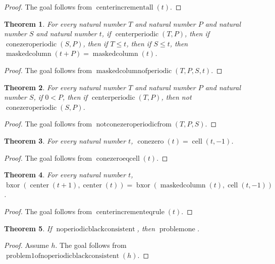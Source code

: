 \documentclass[11pt]{article}
\newtheorem{theorem}{Theorem}[section]
\theoremstyle{definition}
\begin{document}
\begin{proof}
The goal follows from \(\operatorname{centerincrementall}(t)\).
\end{proof}
\begin{theorem}
\label{ll:observations:masked-column-of-periodic}
For every natural number \(T\) and natural number \(P\) and natural number \(S\) and natural number \(t\), if \(\operatorname{centerperiodic}(T, P)\), then if \(\operatorname{conezeroperiodic}(S, P)\), then if \(T \le t\), then if \(S \le t\), then \(\operatorname{maskedcolumn}(t + P) = \operatorname{maskedcolumn}(t)\).
\end{theorem}
\begin{proof}
The goal follows from \(\operatorname{maskedcolumnofperiodic}(T, P, S, t)\).
\end{proof}
\begin{theorem}
\label{ll:observations:not-cone-zero-periodic-from}
For every natural number \(T\) and natural number \(P\) and natural number \(S\), if \(0 < P\), then if \(\operatorname{centerperiodic}(T, P)\), then not \(\operatorname{conezeroperiodic}(S, P)\).
\end{theorem}
\begin{proof}
The goal follows from \(\operatorname{notconezeroperiodicfrom}(T, P, S)\).
\end{proof}
\begin{theorem}
\label{ll:observations:cone-zero-eq-cell}
For every natural number \(t\), \(\operatorname{conezero}(t) = \operatorname{cell}(t, -1)\).
\end{theorem}
\begin{proof}
The goal follows from \(\operatorname{conezeroeqcell}(t)\).
\end{proof}
\begin{theorem}
\label{ll:observations:center-increment-eq-rule}
For every natural number \(t\), \(\operatorname{bxor}(\operatorname{center}(t + 1), \operatorname{center}(t)) = \operatorname{bxor}(\operatorname{maskedcolumn}(t), \operatorname{cell}(t, -1))\).
\end{theorem}
\begin{proof}
The goal follows from \(\operatorname{centerincrementeqrule}(t)\).
\end{proof}
\begin{theorem}
\label{ll:observations:problem1-of-no-periodic-black-consistent}
If \(\operatorname{noperiodicblackconsistent}\), then \(\operatorname{problemone}\).
\end{theorem}
\begin{proof}
Assume \(h\).
The goal follows from \(\operatorname{problem1ofnoperiodicblackconsistent}(h)\).
\end{proof}
\end{document}
